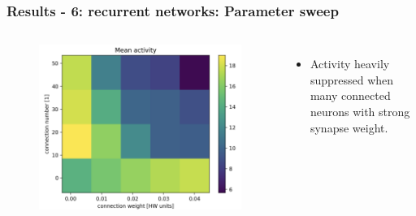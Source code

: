 \documentclass{beamer}
\begin{document}
\begin{frame}
    \frametitle{Results - 6: recurrent networks: Parameter sweep}
    \begin{columns}
          	\begin{figure}
    				\centering
    				\includegraphics[width=\linewidth]{figures/activity_sweep.png}
 		   \end{figure}
 		   \begin{itemize}
          		\item Activity heavily suppressed when many connected neurons with 
          		strong synapse weight.
          	\end{itemize}


\end{columns}
\end{frame}
\end{document}
